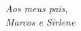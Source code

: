 \documentclass[
	12pt,				%
	openright,			%
	twoside,			%
	a4paper,			%
	english,			%
	french,				%
	spanish,			%
	brazil				%
	]{abntex2}
\begin{document}
% 

\begin{comment}
\begin{folhadeaprovacao}
  \begin{center}
    {\ABNTEXchapterfont\large\imprimirautor}
    \vspace*{\fill}\vspace*{\fill}
    \begin{center}
      \ABNTEXchapterfont\bfseries\Large\imprimirtitulo
    \end{center}
    \vspace*{\fill}
    \hspace{.45\textwidth}
    \begin{minipage}{.5\textwidth}
        \imprimirpreambulo
    \end{minipage}%
    \vspace*{\fill}
   \end{center}
   Trabalho aprovado. \imprimirlocal, 22 de março de 2017:
   \assinatura{\textbf{\imprimirorientador} \\ Orientador}
   \assinatura{\textbf{Professor} \\ Convidado 1}
   \assinatura{\textbf{Professor} \\ Convidado 2}
   \assinatura{\textbf{Professor} \\ Convidado 3}
   \assinatura{\textbf{Professor} \\ Convidado 4}
   \begin{center}
    \vspace*{0.5cm}
    {\large\imprimirlocal}
    \par
    {\large\imprimirdata}
    \vspace*{1cm}
  \end{center}  
\end{folhadeaprovacao}
\end{comment}

\begin{dedicatoria}
   \vspace*{\fill}
   \centering
   \noindent
   \textit{Aos meus pais, \\ Marcos e Sirlene} \vspace*{\fill}
\end{dedicatoria}
\end{document}
